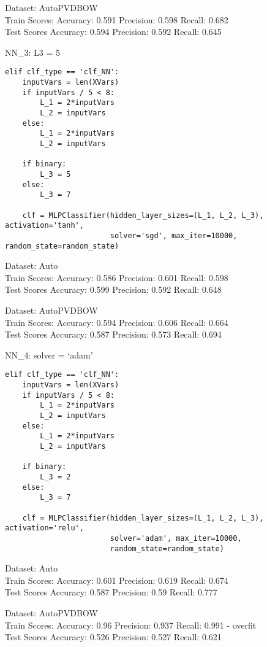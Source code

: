 \documentclass[11pt,preprint, authoryear]{elsarticle}
\numberwithin{equation}{section}
\numberwithin{figure}{section}
\numberwithin{table}{section}
\begin{document}
Dataset: AutoPVDBOW\\
Train Scores: Accuracy: 0.591 Precision: 0.598 Recall: 0.682\\
Test Scores Accuracy: 0.594 Precision: 0.592 Recall: 0.645

NN\_3: L3 = 5

\begin{verbatim}
elif clf_type == 'clf_NN':
    inputVars = len(XVars)
    if inputVars / 5 < 8:
        L_1 = 2*inputVars
        L_2 = inputVars
    else:
        L_1 = 2*inputVars
        L_2 = inputVars

    if binary:
        L_3 = 5
    else:
        L_3 = 7

    clf = MLPClassifier(hidden_layer_sizes=(L_1, L_2, L_3), activation='tanh',
                        solver='sgd', max_iter=10000, random_state=random_state)

\end{verbatim}

Dataset: Auto\\
Train Scores: Accuracy: 0.586 Precision: 0.601 Recall: 0.598\\
Test Scores Accuracy: 0.599 Precision: 0.592 Recall: 0.648

Dataset: AutoPVDBOW\\
Train Scores: Accuracy: 0.594 Precision: 0.606 Recall: 0.664\\
Test Scores Accuracy: 0.587 Precision: 0.573 Recall: 0.694

NN\_4: solver = `adam'

\begin{verbatim}
elif clf_type == 'clf_NN':
    inputVars = len(XVars)
    if inputVars / 5 < 8:
        L_1 = 2*inputVars
        L_2 = inputVars
    else:
        L_1 = 2*inputVars
        L_2 = inputVars

    if binary:
        L_3 = 2
    else:
        L_3 = 7

    clf = MLPClassifier(hidden_layer_sizes=(L_1, L_2, L_3), activation='relu',
                        solver='adam', max_iter=10000,
                        random_state=random_state)
\end{verbatim}

Dataset: Auto\\
Train Scores: Accuracy: 0.601 Precision: 0.619 Recall: 0.674\\
Test Scores Accuracy: 0.587 Precision: 0.59 Recall: 0.777

Dataset: AutoPVDBOW\\
Train Scores: Accuracy: 0.96 Precision: 0.937 Recall: 0.991 - overfit\\
Test Scores Accuracy: 0.526 Precision: 0.527 Recall: 0.621
\end{document}
